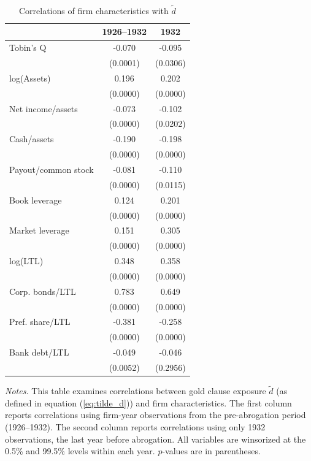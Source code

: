 \begin{table}[p]\centering
\caption{\\ Correlations of firm characteristics with $\tilde{d}$}
\label{tabapp:correlation} \scriptsize
\renewcommand{\arraystretch}{1.2}
    \begin{threeparttable}
        \begin{tabular}{lcc}
            \toprule
            & 1926--1932 & 1932 \\
            \midrule
            Tobin's Q & -0.070 & -0.095 \\
            & (0.0001) & (0.0306) \\
            log(Assets) &  0.196 &  0.202 \\
            & (0.0000) & (0.0000) \\
            Net income/assets & -0.073 & -0.102 \\
            & (0.0000) & (0.0202) \\
            Cash/assets & -0.190 & -0.198 \\
            & (0.0000) & (0.0000) \\
            Payout/common stock & -0.081 & -0.110 \\
            & (0.0000) & (0.0115) \\
            Book leverage &  0.124 &  0.201 \\
            & (0.0000) & (0.0000) \\
            Market leverage &  0.151 &  0.305 \\
            & (0.0000) & (0.0000) \\
            log(LTL) &  0.348 &  0.358 \\
            & (0.0000) & (0.0000) \\
            Corp. bonds/LTL &  0.783 &  0.649 \\
            & (0.0000) & (0.0000) \\
            Pref. share/LTL & -0.381 & -0.258 \\
            & (0.0000) & (0.0000) \\
            Bank debt/LTL & -0.049 & -0.046 \\
            & (0.0052) & (0.2956) \\
            \bottomrule
        \end{tabular}
    \end{threeparttable}

\vspace*{3mm} \justifying \noindent
\footnotesize{\textit{Notes.} This table examines correlations between gold clause exposure $\tilde{d}$ (as defined in equation (\ref{eq:tilde_d})) and firm characteristics. The first column reports correlations using firm-year observations from the pre-abrogation period (1926--1932). The second column reports correlations using only 1932 observations, the last year before abrogation. All variables are winsorized at the 0.5\% and 99.5\% levels within each year. $p$-values are in parentheses.}
\end{table}
